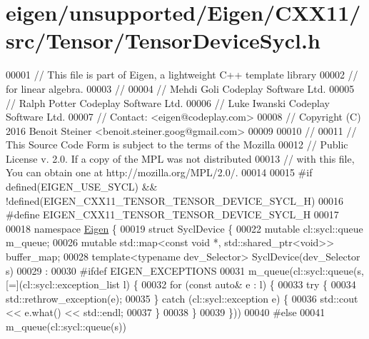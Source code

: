 \hypertarget{eigen_2unsupported_2_eigen_2_c_x_x11_2src_2_tensor_2_tensor_device_sycl_8h_source}{}\section{eigen/unsupported/\+Eigen/\+C\+X\+X11/src/\+Tensor/\+Tensor\+Device\+Sycl.h}
\label{eigen_2unsupported_2_eigen_2_c_x_x11_2src_2_tensor_2_tensor_device_sycl_8h_source}

\begin{DoxyCode}
00001 \textcolor{comment}{// This file is part of Eigen, a lightweight C++ template library}
00002 \textcolor{comment}{// for linear algebra.}
00003 \textcolor{comment}{//}
00004 \textcolor{comment}{// Mehdi Goli    Codeplay Software Ltd.}
00005 \textcolor{comment}{// Ralph Potter  Codeplay Software Ltd.}
00006 \textcolor{comment}{// Luke Iwanski  Codeplay Software Ltd.}
00007 \textcolor{comment}{// Contact: <eigen@codeplay.com>}
00008 \textcolor{comment}{// Copyright (C) 2016 Benoit Steiner <benoit.steiner.goog@gmail.com>}
00009 
00010 \textcolor{comment}{//}
00011 \textcolor{comment}{// This Source Code Form is subject to the terms of the Mozilla}
00012 \textcolor{comment}{// Public License v. 2.0. If a copy of the MPL was not distributed}
00013 \textcolor{comment}{// with this file, You can obtain one at http://mozilla.org/MPL/2.0/.}
00014 
00015 \textcolor{preprocessor}{#if defined(EIGEN\_USE\_SYCL) && !defined(EIGEN\_CXX11\_TENSOR\_TENSOR\_DEVICE\_SYCL\_H)}
00016 \textcolor{preprocessor}{#define EIGEN\_CXX11\_TENSOR\_TENSOR\_DEVICE\_SYCL\_H}
00017 
00018 \textcolor{keyword}{namespace }\hyperlink{namespace_eigen}{Eigen} \{
00019 \textcolor{keyword}{struct }SyclDevice \{
00022   \textcolor{keyword}{mutable} cl::sycl::queue m\_queue;
00026   \textcolor{keyword}{mutable} std::map<const void *, std::shared\_ptr<void>> buffer\_map;
00028   \textcolor{keyword}{template}<\textcolor{keyword}{typename} dev\_Selector> SyclDevice(dev\_Selector s)
00029   :
00030 #ifdef EIGEN\_EXCEPTIONS
00031   m\_queue(cl::sycl::queue(s, [=](cl::sycl::exception\_list l) \{
00032     \textcolor{keywordflow}{for} (\textcolor{keyword}{const} \textcolor{keyword}{auto}& e : l) \{
00033       \textcolor{keywordflow}{try} \{
00034         std::rethrow\_exception(e);
00035       \} \textcolor{keywordflow}{catch} (cl::sycl::exception e) \{
00036           std::cout << e.what() << std::endl;
00037         \}
00038     \}
00039   \}))
00040 \textcolor{preprocessor}{#else}
00041   m\_queue(cl::sycl::queue(s))

\end{DoxyCode}
